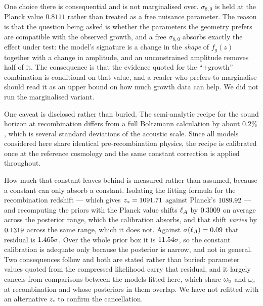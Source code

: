 One choice there is consequential and is not marginalised over.
$\sigma_{8,0}$ is held at the Planck value $0.8111$ rather than treated as a
free nuisance parameter. The reason is that the question being asked is
whether the parameters the geometry prefers are compatible with the observed
growth, and a free $\sigma_{8,0}$ absorbs exactly the effect under test: the
model's signature is a change in the \emph{shape} of $f_g(z)$ together with a
change in amplitude, and an unconstrained amplitude removes half of it. The
consequence is that the evidence quoted for the ``$+$growth'' combination is
conditional on that value, and a reader who prefers to marginalise should read
it as an upper bound on how much growth data can help. We did not run the
marginalised variant.

One caveat is disclosed rather than buried. The semi-analytic recipe for the
sound horizon at recombination differs from a full Boltzmann calculation by
about $0.2\%$, which is several standard deviations of the acoustic scale. Since
all models considered here share identical pre-recombination physics, the
recipe is calibrated once at the reference cosmology and the same constant
correction is applied throughout.

How much that constant leaves behind is measured rather than assumed, because
a constant can only absorb a constant. Isolating the fitting formula for the
recombination redshift --- which gives
$z_*=1091.71$ against Planck's
$1089.92$ --- and recomputing the priors with
the Planck value shifts $\ell_{A}$ by
$0.3009$ on average across the
posterior range, which the calibration absorbs, and that shift \emph{varies}
by $0.1319$ across the same range, which
it does not. Against $\sigma(\ell_{A})=0.09$ that
residual is $1.465\sigma$. Over the
whole prior box it is $11.54\sigma$,
so the constant calibration is adequate only because the posterior is narrow,
and not in general. Two consequences follow and both are stated rather than
buried: parameter values quoted from the compressed likelihood carry that
residual, and it largely cancels from comparisons between the models fitted
here, which share $\omega_{\rm b}$ and $\omega_c$ at recombination and whose
posteriors in them overlap. We have not refitted with an alternative
$z_*$ to confirm the cancellation.

